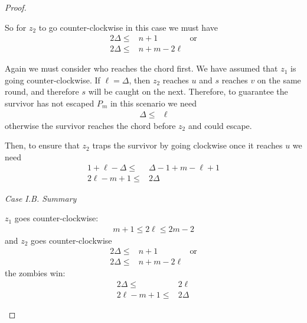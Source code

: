 \documentclass[letterpaper, 10pt]{article}
\begin{document}
\begin{proof}
\begin{proofpart}
  So for $z_2$ to go counter-clockwise in this case we must have
  \begin{align*}
   2 \Delta \leq & n + 1         & \text{or} \\
   2 \Delta \leq & n + m - 2\ell
  \end{align*}

  Again we must consider who reaches the chord first. We have assumed that $z_1$ is going counter-clockwise. If $\ell = \Delta$, then $z_2$ reaches $u$ and $s$ reaches $v$ on the same round, and therefore $s$ will be caught on the next. Therefore, to guarantee the survivor has not escaped $P_m$ in this scenario we need
  \begin{align*}
   \Delta \leq & \ell
  \end{align*}
  otherwise the survivor reaches the chord before $z_2$ and
  could escape.

  Then, to ensure that $z_2$ traps the survivor by going clockwise once
  it reaches $u$ we need
  \begin{align*}
   1 + \ell - \Delta \leq & \Delta -1 + m - \ell + 1 \\
   2\ell - m + 1 \leq     & 2 \Delta
  \end{align*}

  \textit{Case I.B. Summary}

  $z_1$ goes counter-clockwise:
  \begin{align*}
   m + 1 \leq 2 \ell \leq 2m - 2
  \end{align*}
  and $z_2$ goes counter-clockwise
  \begin{align*}
   2 \Delta \leq & n + 1         & \text{or} \\
   2 \Delta \leq & n + m - 2\ell
  \end{align*}
  the zombies win:
  \begin{align*}
   2 \Delta \leq      & 2 \ell   \\
   2\ell - m + 1 \leq & 2 \Delta
  \end{align*}


\end{proofpart}
\end{proof}
\end{document}
